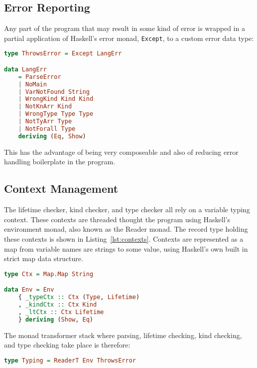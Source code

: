 \subsection{Error Reporting}
Any part of the program that may result in some kind of error is wrapped in a
partial application of Haskell's error monad, \lstinline{Except}, to a custom
error data type:

\begin{lstlisting}[caption=Partially applied error monad and language errors., language=Haskell, label={lst:types}]
type ThrowsError = Except LangErr

data LangErr
    = ParseError
    | NoMain
    | VarNotFound String
    | WrongKind Kind Kind
    | NotKnArr Kind
    | WrongType Type Type
    | NotTyArr Type
    | NotForall Type
    deriving (Eq, Show)
\end{lstlisting}

This has the advantage of being very composeable and also of reducing error
handling boilerplate in the program.

\subsection{Context Management}\label{sec:ctx}
The lifetime checker, kind checker, and type checker all rely on a variable
typing context. These contexts are threaded thought the program using Haskell's
environment monad, also known as the Reader monad. The record type holding
these contexts is shown in Listing~\ref{lst:contexts}. Contexts are represented
as a map from variable names are strings to some value, using Haskell's own
built in strict map data structure.

\begin{lstlisting}[caption=Record data type showing contexts., language=Haskell, label={lst:contexts}]
type Ctx = Map.Map String

data Env = Env
    { _typeCtx :: Ctx (Type, Lifetime)
    , _kindCtx :: Ctx Kind
    , _ltCtx :: Ctx Lifetime
    } deriving (Show, Eq)
\end{lstlisting}

The monad transformer stack where parsing, lifetime checking, kind checking, and type
checking take place is therefore:

\begin{lstlisting}[caption=Envirnment and error monad stack., language=Haskell, label={lst:monads}]
type Typing = ReaderT Env ThrowsError
\end{lstlisting}

